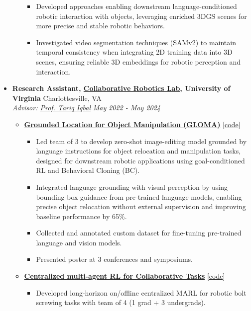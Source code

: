 \documentclass[letterpaper,11pt]{article}
\newcommand{\linkhref}[2]{\textcolor{linkblue}{\href{#1}{#2}}}
\newcommand{\Date}[1]{\textit{\small #1}}
\newcommand{\heading}[4]{
  \textbf{#1} \hfill #2 \\
  \textit{\small#3} \hfill \Date{#4}
}
\begin{document}
\begin{itemize}[label={}, leftmargin=0pt]
\begin{itemize}
\begin{itemize}
                        \item Developed approaches enabling downstream language-conditioned robotic interaction with objects, leveraging enriched 3DGS scenes for more precise and stable robotic behaviors.
                        \item Investigated video segmentation techniques (SAMv2) to maintain temporal consistency when integrating 2D training data into 3D scenes, ensuring reliable 3D embeddings for robotic perception and interaction.
                    \end{itemize}
          \end{itemize}
    \item \heading{Research Assistant, \href{https://www.collabrobotics.com/}{Collaborative Robotics Lab}, University of Virginia}{Charlottesville, VA}
          {Advisor: \href{https://www.tiqbal.com/}{Prof. Tariq Iqbal}}{May 2022 - May 2024}
          \begin{itemize}
              \item \href{https://github.com/branyang02/GLOMA}{\textbf{Grounded Location for Object Manipulation (GLOMA)}} [\linkhref{https://github.com/branyang02/GLOMA}{code}]
                    \begin{itemize}
                        \item Led team of 3 to develop zero-shot image-editing model grounded by language instructions for object relocation and manipulation tasks, designed for downstream robotic applications using goal-conditioned RL and Behavioral Cloning (BC).
                        \item Integrated language grounding with visual perception by using bounding box guidance from pre-trained language models, enabling precise object relocation without external supervision and improving baseline performance by 65\%.
                        \item Collected and annotated custom dataset for fine-tuning pre-trained language and vision models.
                        \item Presented poster at 3 conferences and symposiums.
                    \end{itemize}
              \item \textbf{\href{https://github.com/branyang02/PandaFactory}{Centralized multi-agent RL for Collaborative Tasks}} [\linkhref{https://github.com/branyang02/PandaFactory}{code}]
                    \begin{itemize}
                        \item Developed long-horizon on/offline centralized MARL for robotic bolt screwing tasks with team of 4 (1 grad + 3 undergrads).

\end{itemize}
\end{itemize}
\end{itemize}
\end{document}
